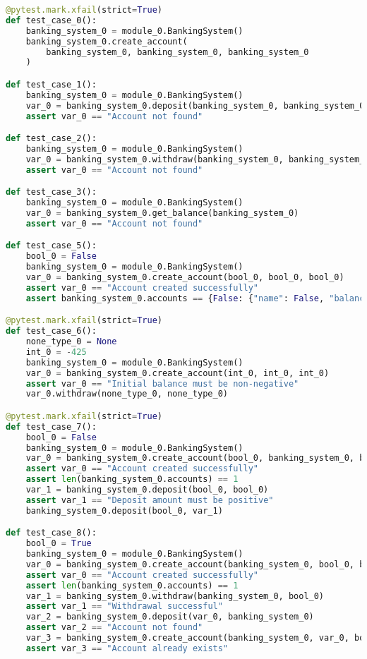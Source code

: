 \documentclass{article}
\begin{document}
\begin{lstlisting}[language=Python]
@pytest.mark.xfail(strict=True)
def test_case_0():
    banking_system_0 = module_0.BankingSystem()
    banking_system_0.create_account(
        banking_system_0, banking_system_0, banking_system_0
    )

def test_case_1():
    banking_system_0 = module_0.BankingSystem()
    var_0 = banking_system_0.deposit(banking_system_0, banking_system_0)
    assert var_0 == "Account not found"

def test_case_2():
    banking_system_0 = module_0.BankingSystem()
    var_0 = banking_system_0.withdraw(banking_system_0, banking_system_0)
    assert var_0 == "Account not found"

def test_case_3():
    banking_system_0 = module_0.BankingSystem()
    var_0 = banking_system_0.get_balance(banking_system_0)
    assert var_0 == "Account not found"

def test_case_5():
    bool_0 = False
    banking_system_0 = module_0.BankingSystem()
    var_0 = banking_system_0.create_account(bool_0, bool_0, bool_0)
    assert var_0 == "Account created successfully"
    assert banking_system_0.accounts == {False: {"name": False, "balance": False}}

@pytest.mark.xfail(strict=True)
def test_case_6():
    none_type_0 = None
    int_0 = -425
    banking_system_0 = module_0.BankingSystem()
    var_0 = banking_system_0.create_account(int_0, int_0, int_0)
    assert var_0 == "Initial balance must be non-negative"
    var_0.withdraw(none_type_0, none_type_0)

@pytest.mark.xfail(strict=True)
def test_case_7():
    bool_0 = False
    banking_system_0 = module_0.BankingSystem()
    var_0 = banking_system_0.create_account(bool_0, banking_system_0, bool_0)
    assert var_0 == "Account created successfully"
    assert len(banking_system_0.accounts) == 1
    var_1 = banking_system_0.deposit(bool_0, bool_0)
    assert var_1 == "Deposit amount must be positive"
    banking_system_0.deposit(bool_0, var_1)

def test_case_8():
    bool_0 = True
    banking_system_0 = module_0.BankingSystem()
    var_0 = banking_system_0.create_account(banking_system_0, bool_0, bool_0)
    assert var_0 == "Account created successfully"
    assert len(banking_system_0.accounts) == 1
    var_1 = banking_system_0.withdraw(banking_system_0, bool_0)
    assert var_1 == "Withdrawal successful"
    var_2 = banking_system_0.deposit(var_0, banking_system_0)
    assert var_2 == "Account not found"
    var_3 = banking_system_0.create_account(banking_system_0, var_0, bool_0)
    assert var_3 == "Account already exists"


\end{lstlisting}
\end{document}

